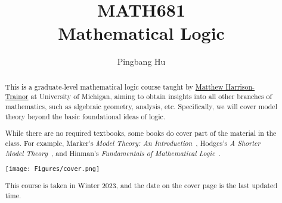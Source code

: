 \documentclass[a4paper]{report}
\author{Pingbang Hu}
\title{MATH681\\Mathematical Logic}
\begin{document}
\maketitle

\begin{abstract}
	This is a graduate-level mathematical logic course taught by \href{http://www-personal.umich.edu/~matthhar/}{Matthew Harrison-Trainor} at University of Michigan, aiming to obtain insights into all other branches of mathematics, such as algebraic geometry, analysis, etc. Specifically, we will cover model theory beyond the basic foundational ideas of logic.

	While there are no required textbooks, some books do cover part of the material in the class. For example, Marker's \emph{Model Theory: An Introduction}~\cite{marker2002model}, Hodges's \emph{A Shorter Model Theory}~\cite{hodges1997shorter}, and Hinman's \emph{Fundamentals of Mathematical Logic}~\cite{hinman2005fundamentals}.

	\vfill
	\begin{center}
		\texttt{[image: Figures/cover.png]}
	\end{center}
	\vfill
	This course is taken in Winter 2023, and the date on the cover page is the last updated time.
\end{abstract}

\tableofcontents


\newpage
\appendix
\appendixpage{}



\newpage
\printbibliography{}
\end{document}
